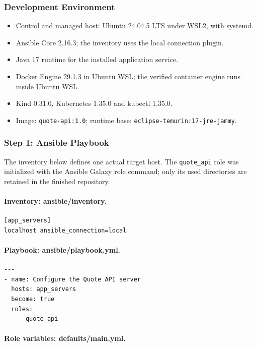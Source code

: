 \documentclass[12pt,a4paper]{article}
\begin{document}
\subsubsection*{Development Environment}
\begin{itemize}[nosep]
\item Control and managed host: Ubuntu 24.04.5 LTS under WSL2, with systemd.
\item Ansible Core 2.16.3; the inventory uses the local connection plugin.
\item Java 17 runtime for the installed application service.
\item Docker Engine 29.1.3 in Ubuntu WSL; the verified container engine runs inside Ubuntu WSL.
\item Kind 0.31.0, Kubernetes 1.35.0 and kubectl 1.35.0.
\item Image: \texttt{quote-api:1.0}; runtime base: \texttt{eclipse-temurin:17-jre-jammy}.
\end{itemize}

\subsubsection*{Step 1: Ansible Playbook}
The inventory below defines one actual target host. The \texttt{quote\_api} role was initialized with the Ansible Galaxy role command; only its used directories are retained in the finished repository.
\paragraph{Inventory: ansible/inventory.}

\begin{lstlisting}[language={}]
[app_servers]
localhost ansible_connection=local
\end{lstlisting}

\paragraph{Playbook: ansible/playbook.yml.}

\begin{lstlisting}[language={}]
---
- name: Configure the Quote API server
  hosts: app_servers
  become: true
  roles:
    - quote_api
\end{lstlisting}

\paragraph{Role variables: defaults/main.yml.}
\end{document}
